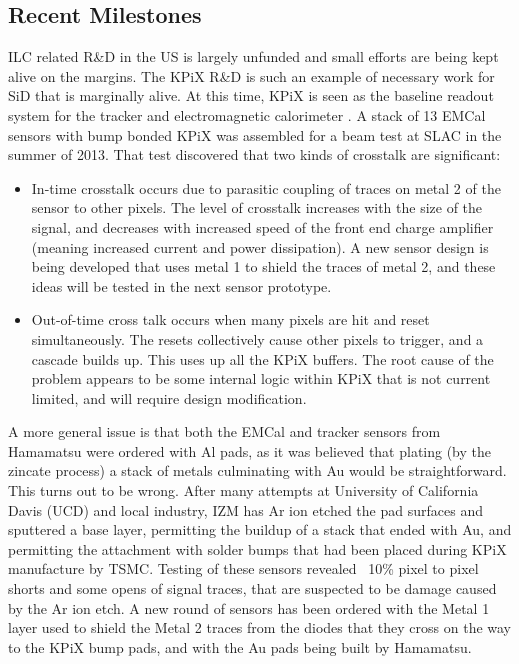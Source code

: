 \subsection{Recent Milestones}
ILC related R&D in the US is largely unfunded and small efforts are being kept alive on the margins. The KPiX R&D is such an example of necessary work for SiD that is marginally alive.
At this time, KPiX is seen as the baseline readout system for the tracker and electromagnetic calorimeter .  A stack of 13 EMCal sensors with bump bonded KPiX was assembled for a beam test at SLAC in the summer of 2013. That test discovered that two kinds of crosstalk are significant:
\begin{itemize}
	\item In-time crosstalk occurs due to parasitic coupling of traces on metal 2 of the sensor to other pixels. The level of crosstalk increases with the size of the signal, and decreases with increased speed of the front end charge amplifier (meaning increased current and power dissipation).  A new sensor design is being developed that uses metal 1 to shield the traces of metal 2, and these ideas will be tested in the next sensor prototype.
	\item Out-of-time cross talk occurs when many pixels are hit and reset simultaneously. The resets collectively cause other pixels to trigger, and a cascade builds up. This uses up all the KPiX buffers. The root cause of the problem appears to be some internal logic within KPiX that is not current limited, and will require design modification.
\end{itemize}
A more general issue is that both the EMCal and tracker sensors from Hamamatsu were ordered with Al pads, as it was believed that plating (by the zincate process) a stack of metals culminating with Au would be straightforward. This turns out to be wrong. After many attempts at University of California Davis (UCD) and local industry, IZM  has Ar ion etched the pad surfaces and sputtered a base layer, permitting the buildup of a stack that ended with Au, and permitting the attachment with solder bumps that had been placed during KPiX manufacture by TSMC. Testing of these sensors revealed ~10\% pixel to pixel shorts and some opens of signal traces, that are suspected to be damage caused by the Ar ion etch. A new round of sensors has been ordered with the Metal 1 layer used to shield the Metal 2 traces from the diodes that they cross on the way to the KPiX bump pads, and with the Au pads being built by Hamamatsu.

